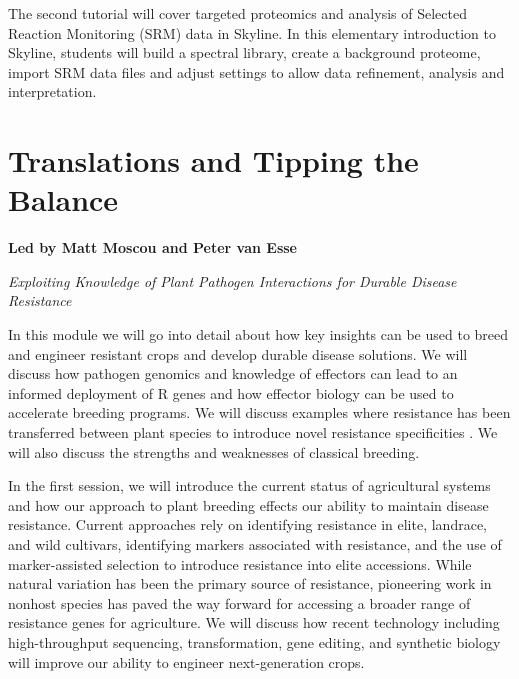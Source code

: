 \documentclass[12pt,]{book}
\theoremstyle{definition}
\theoremstyle{definition}
\theoremstyle{remark}
\begin{document}
The second tutorial will cover targeted proteomics and analysis of
Selected Reaction Monitoring (SRM) data in Skyline. In this elementary
introduction to Skyline, students will build a spectral library, create
a background proteome, import SRM data files and adjust settings to
allow data refinement, analysis and interpretation.

\chapter*{Translations and Tipping the
Balance}\label{translations-and-tipping-the-balance}

\textbf{Led by Matt Moscou and Peter van Esse}

\emph{Exploiting Knowledge of Plant Pathogen Interactions for Durable
Disease Resistance}

In this module we will go into detail about how key insights can be used
to breed and engineer resistant crops and develop durable disease
solutions. We will discuss how pathogen genomics and knowledge of
effectors can lead to an informed deployment of R genes and how effector
biology can be used to accelerate breeding programs. We will discuss
examples where resistance has been transferred between plant species to
introduce novel resistance specificities
\citep{Kawashima:2016hx, Lacombe:2010ga, Tai:1999wa}. We will also
discuss the strengths and weaknesses of classical breeding.

In the first session, we will introduce the current status of
agricultural systems and how our approach to plant breeding effects our
ability to maintain disease resistance. Current approaches rely on
identifying resistance in elite, landrace, and wild cultivars,
identifying markers associated with resistance, and the use of
marker-assisted selection to introduce resistance into elite accessions.
While natural variation has been the primary source of resistance,
pioneering work in nonhost species has paved the way forward for
accessing a broader range of resistance genes for agriculture. We will
discuss how recent technology including high-throughput sequencing,
transformation, gene editing, and synthetic biology will improve our
ability to engineer next-generation crops.
\end{document}

